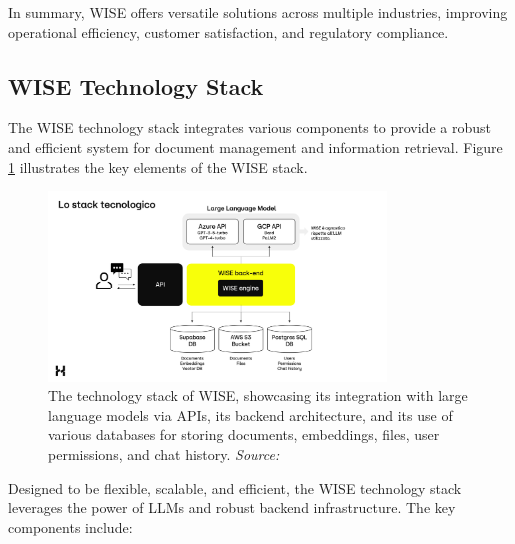 In summary, WISE offers versatile solutions across multiple industries, improving operational efficiency, customer satisfaction, and regulatory compliance. \cite{hpa2024}

\subsection{WISE Technology Stack}

The WISE technology stack integrates various components to provide a robust and efficient system for document management and information retrieval. Figure \ref{fig:wise-stack} illustrates the key elements of the WISE stack.

\begin{figure}[h!]
    \centering
    \includegraphics[width=0.8\textwidth]{images/wise/wise-stack.png}
    \caption{The technology stack of WISE, showcasing its integration with large language models via APIs, its backend architecture, and its use of various databases for storing documents, embeddings, files, user permissions, and chat history. \textit{Source:} \cite{hpa2024}}
    \label{fig:wise-stack}
\end{figure}

Designed to be flexible, scalable, and efficient, the WISE technology stack leverages the power of LLMs and robust backend infrastructure. The key components include:

